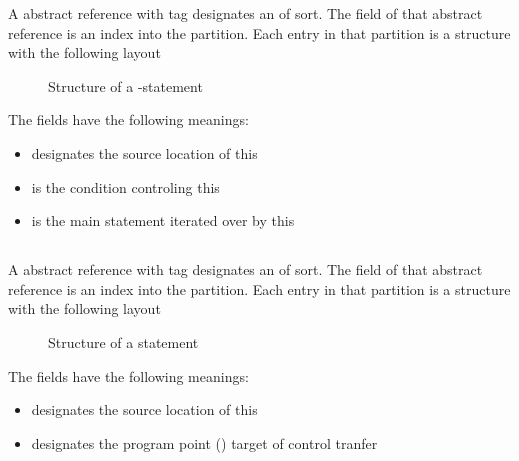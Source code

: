 A  abstract reference with tag  designates an  of  sort.
The  field of that abstract reference is an index into the  partition.
Each entry in that partition is a structure with the following layout
%
\begin{figure}[H]
	\centering
	\caption{Structure of a -statement}
	\label{fig:ifc-do-stmt-structure}
\end{figure}
%
The fields have the following meanings:
\begin{itemize}
	\item {} designates the source location of this 
	\item {} is the condition controling this 
	\item {} is the main statement iterated over by this 
\end{itemize}



\subsection{}
\label{sec:ifc:StmtSort:Goto}

A  abstract reference with tag  designates an  of  sort.
The  field of that abstract reference is an index into the  partition.
Each entry in that partition is a structure with the following layout
%
\begin{figure}[H]
	\centering
	\caption{Structure of a  statement}
	\label{fig:ifc-goto-stmt-structure}
\end{figure}
%
The fields have the following meanings:
\begin{itemize}
	\item {} designates the source location of this 
	\item {} designates the program point () target of control tranfer
\end{itemize}

